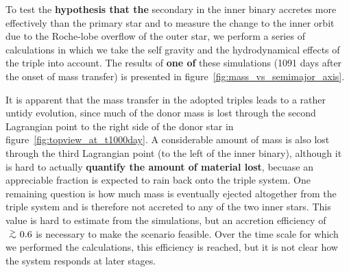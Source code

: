 \documentclass[twocolumn]{aastex62}
\def\apgt{\ {\raise-.5ex\hbox{$\buildrel>\over\sim$}}\ }
\begin{document}
To test the \textbf{hypothesis that the} secondary in the inner binary
accretes more effectively than the primary star and to measure the
change to the inner orbit due to the Roche-lobe overflow of the outer
star, we perform a series of calculations in which we take the self
gravity and the hydrodynamical effects of the triple into account.
The results of \textbf{one of} these simulations (1091 days after
the onset of mass transfer) is presented in
figure~\ref{fig:mass_vs_semimajor_axis}.

It is apparent that the mass transfer in the adopted triples leads to
a rather untidy evolution, since much of the donor mass is lost
through the second Lagrangian point to the right side of the donor
star in figure~\ref{fig:topview_at_t1000day}. A considerable amount of
mass is also lost through the third Lagrangian point (to the left of
the inner binary), although it is hard to actually \textbf{quantify the amount
of material lost}, becuase an appreciable fraction is expected to rain
back onto the triple system.  One remaining question is how much mass
is eventually ejected altogether from the triple system and is
therefore not accreted to any of the two inner stars. This value is
hard to estimate from the simulations, but an accretion efficiency of
$\apgt 0.6$ is necessary to make the scenario feasible. Over the time
scale for which we performed the calculations, this efficiency is
reached, but it is not clear how the system responds at later stages.
\end{document}
